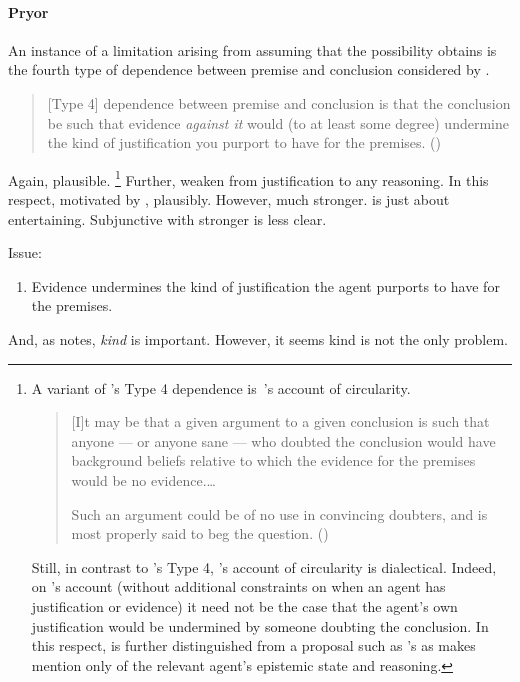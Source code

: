 \paragraph{Pryor}

\begin{note}
  An instance of a limitation arising from assuming that the possibility obtains is the fourth type of dependence between premise and conclusion considered by \citeauthor{Pryor:2004ws}.

  \begin{quote}
    [Type 4] dependence between premise and conclusion is that the conclusion be such that evidence \emph{against it} would (to at least some degree) undermine the kind of justification you purport to have for the premises.\nolinebreak
    \mbox{}\hfill\mbox{(\citeyear[359]{Pryor:2004ws})}
  \end{quote}

  Again, plausible.\nolinebreak
  \footnote{
    A variant of \citeauthor{Pryor:2004ws}'s Type 4 dependence is~\citeauthor{Jackson:1984vk}'s account of circularity.
    \begin{quote}
      [I]t may be that a given argument to a given conclusion is such that anyone --- or anyone sane --- who doubted the conclusion would have background beliefs relative to which the evidence for the premises would be no evidence.\space \dots

      Such an argument could be of no use in convincing doubters, and is most properly said to beg the question.\nolinebreak
      \mbox{}\hfill\mbox{(\Citeyear[111-12]{Jackson:1984vk})}
    \end{quote}
    Still, in contrast to \citeauthor{Pryor:2004ws}'s Type 4, \citeauthor{Jackson:1984vk}'s account of circularity is dialectical.
    Indeed, on \citeauthor{Jackson:1984vk}'s account (without additional constraints on when an agent has justification or evidence) it need not be the case that the agent's own justification would be undermined by someone doubting the conclusion.
    In this respect, \ideaCS{} is further distinguished from a proposal such as \citeauthor{Jackson:1984vk}'s as \ideaCS{} makes mention only of the relevant agent's epistemic state and reasoning.
  }
  Further, weaken from justification to any reasoning.
  In this respect, motivated by \ideaS{}, plausibly.
  However, much stronger.
  \ideaS{} is just about entertaining.
  Subjunctive with stronger is less clear.

  Issue:
  \begin{enumerate}
  \item Evidence undermines the kind of justification the agent purports to have for the premises.
  \end{enumerate}

  And, as \citeauthor{Pryor:2004ws} notes, \emph{kind} is important.
  However, it seems kind is not the only problem.
\end{note}

